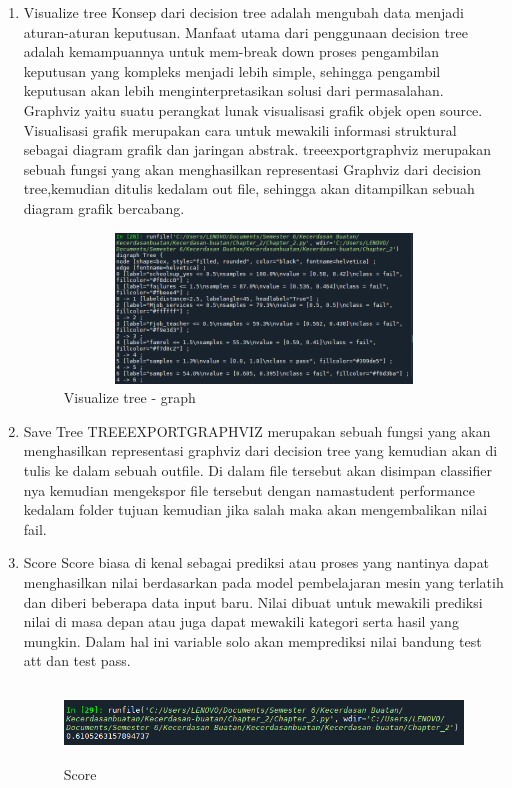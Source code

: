 \begin{enumerate}
\item Visualize tree
\newline Konsep dari decision tree adalah mengubah data menjadi aturan-aturan keputusan. Manfaat utama dari penggunaan decision tree adalah kemampuannya untuk mem-break down proses pengambilan keputusan yang kompleks menjadi lebih simple, sehingga pengambil keputusan akan lebih menginterpretasikan solusi dari permasalahan. Graphviz yaitu suatu perangkat lunak visualisasi grafik objek open source. Visualisasi grafik merupakan cara untuk mewakili informasi struktural sebagai diagram grafik dan jaringan abstrak. treeexportgraphviz merupakan sebuah fungsi yang akan menghasilkan representasi Graphviz dari decision tree,kemudian ditulis kedalam out file, sehingga akan ditampilkan sebuah diagram grafik bercabang.
\begin{figure}[!htbp]
	\centering
	\includegraphics[width=17cm,height=4cm]{figures/Cp2-f.png}
	\caption{Visualize tree - graph}
	\label{penanda}
\end{figure}

\item Save Tree
\newline TREEEXPORTGRAPHVIZ merupakan sebuah fungsi yang akan menghasilkan representasi graphviz dari decision tree yang kemudian akan di tulis ke dalam sebuah outfile. Di dalam file tersebut akan disimpan classifier nya kemudian mengekspor file tersebut dengan namastudent performance kedalam folder tujuan kemudian jika salah maka akan mengembalikan nilai fail.


\item Score
\newline Score biasa di kenal sebagai prediksi atau proses yang nantinya dapat menghasilkan nilai berdasarkan pada model pembelajaran mesin yang terlatih dan diberi beberapa data input baru. Nilai dibuat untuk mewakili prediksi nilai di masa depan atau juga dapat mewakili kategori serta hasil yang mungkin. Dalam hal ini variable solo akan memprediksi nilai bandung test att dan test pass.
\begin{figure}[!htbp]
	\centering
	\includegraphics[width=14cm,height=2cm]{figures/Cp2-g.png}
	\caption{Score}
	\label{penanda}
\end{figure}



\end{enumerate}
